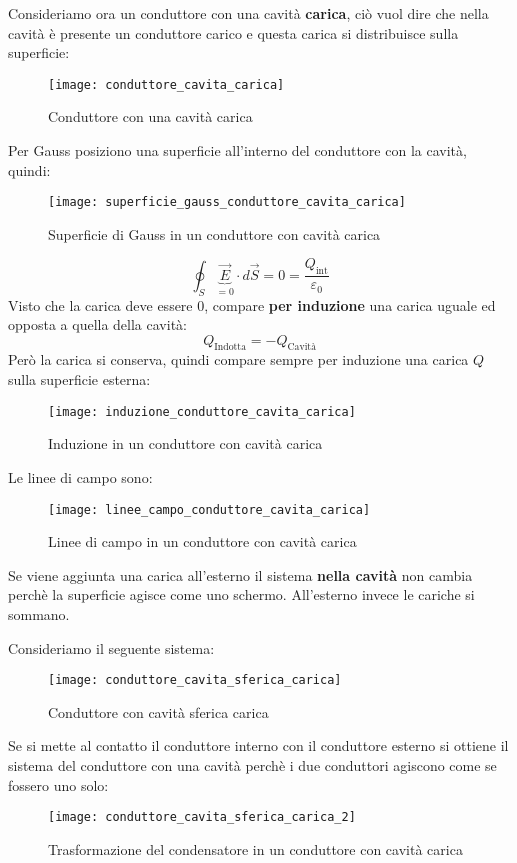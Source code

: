 \documentclass[a4paper]{article}
\begin{document}
\vspace{1em}
\noindent
Consideriamo ora un conduttore con una cavità \textbf{carica}, ciò vuol dire che
nella cavità è presente un conduttore carico e questa carica si distribuisce sulla
superficie:
\begin{figure}[H]
  \centering
  \texttt{[image: conduttore\_cavita\_carica]}
  \caption{Conduttore con una cavità carica}
\end{figure}
\noindent
Per Gauss posiziono una superficie all'interno del conduttore con la cavità, quindi:
\begin{figure}[H]
  \centering
  \texttt{[image: superficie\_gauss\_conduttore\_cavita\_carica]}
  \caption{Superficie di Gauss in un conduttore con cavità carica}
\end{figure}
\[
  \oint_S \underbrace{\vec{E}}_{=0} \cdot d\vec{S} = 0 = \frac{Q_{\text{int}}}{\varepsilon_0}
\] 
Visto che la carica deve essere 0, compare \textbf{per induzione} una carica uguale
ed opposta a quella della cavità:
\[
  Q_{\text{Indotta}} = - Q_{\text{Cavità}}
\]
Però la carica si conserva, quindi compare sempre per induzione una carica \( Q \)
sulla superficie esterna:
\begin{figure}[H]
  \centering
  \texttt{[image: induzione\_conduttore\_cavita\_carica]}
  \caption{Induzione in un conduttore con cavità carica}
\end{figure}
\noindent
Le linee di campo sono:
\begin{figure}[H]
  \centering
  \texttt{[image: linee\_campo\_conduttore\_cavita\_carica]}
  \caption{Linee di campo in un conduttore con cavità carica}
\end{figure}
\noindent
Se viene aggiunta una carica all'esterno il sistema \textbf{nella cavità} non cambia
perchè la superficie agisce come uno schermo. All'esterno invece le cariche si sommano.

\begin{example}
  Consideriamo il seguente sistema:
  \begin{figure}[H]
    \centering
    \texttt{[image: conduttore\_cavita\_sferica\_carica]}
    \caption{Conduttore con cavità sferica carica}
  \end{figure}
  \noindent
  Se si mette al contatto il conduttore interno con il conduttore esterno si ottiene il
  sistema del conduttore con una cavità perchè i due conduttori agiscono come se fossero
  uno solo:
  \begin{figure}[H]
    \centering
    \texttt{[image: conduttore\_cavita\_sferica\_carica\_2]}
    \caption{Trasformazione del condensatore in un conduttore con cavità carica}
  \end{figure}
\end{example}
\end{document}
